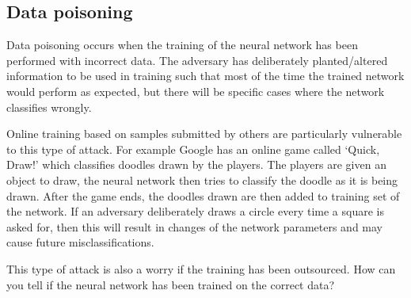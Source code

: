 \subsection{Data poisoning}

Data poisoning occurs when the training of the neural network has been performed with incorrect data. The adversary has deliberately planted/altered information to be used in training such that most of the time the trained network would perform as expected, but there will be specific cases where the network classifies wrongly.

Online training based on samples submitted by others are particularly vulnerable to this type of attack. For example Google has an online game called `Quick, Draw!' which classifies doodles drawn by the players. The players are given an object to draw, the neural network then tries to classify the doodle as it is being drawn. After the game ends, the doodles drawn are then added to training set of the network. If an adversary deliberately draws a circle every time a square is asked for, then this will result in changes of the network parameters and may cause future misclassifications. 

This type of attack is also a worry if the training has been outsourced. How can you tell if the neural network has been trained on the correct data?

